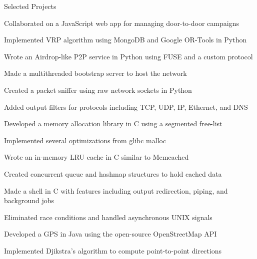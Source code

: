 \documentclass{cv}
\begin{document}
\begin{cvsection}{Selected Projects}
  {
    \item Collaborated on a JavaScript web app for managing door-to-door campaigns
    \item Implemented VRP algorithm using MongoDB and Google OR-Tools in Python
  }
  {
    \item Wrote an Airdrop-like P2P service in Python using FUSE and a custom protocol
    \item Made a multithreaded bootstrap server to host the network
  }
  {
    \item Created a packet sniffer using raw network sockets in Python
    \item Added output filters for protocols including TCP, UDP, IP, Ethernet, and DNS
  }
  {
    \item Developed a memory allocation library in C using a segmented free-list
    \item Implemented several optimizations from glibc malloc
  }
  {
    \item Wrote an in-memory LRU cache in C similar to Memcached
    \item Created concurrent queue and hashmap structures to hold cached data
  }
  {
    \item Made a shell in C with features including output redirection, piping, and background jobs
    \item Eliminated race conditions and handled asynchronous UNIX signals
  }
  {
    \item Developed a GPS in Java using the open-source OpenStreetMap API
    \item Implemented Djikstra's algorithm to compute point-to-point directions
  }
\end{cvsection}
\end{document}
